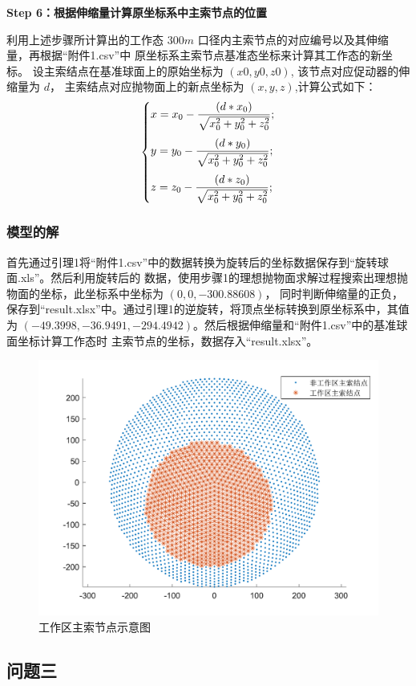 \documentclass[withoutpreface,bwprint]{cumcmthesis} %
\begin{document}
\textbf{Step 6：根据伸缩量计算原坐标系中主索节点的位置}

利用上述步骤所计算出的工作态 $300m$ 口径内主索节点的对应编号以及其伸缩量，再根据“附件1.csv”中
原坐标系主索节点基准态坐标来计算其工作态的新坐标。
设主索结点在基准球面上的原始坐标为 $(x0, y0, z0)$, 该节点对应促动器的伸缩量为 $d$，
主索结点对应抛物面上的新点坐标为 $(x, y,z)$,计算公式如下：
\[
    \begin{dcases}
        \smallskip
        x = x_0 - \frac{(d*x_0)}{\sqrt{x_0^2+y_0^2+z_0^2}}; \\
        \smallskip
        y = y_0 - \frac{(d*y_0)}{\sqrt{x_0^2+y_0^2+z_0^2}}; \\
        z = z_0 - \frac{(d*z_0)}{\sqrt{x_0^2+y_0^2+z_0^2}};
    \end{dcases}
\]
\subsubsection{模型的解}
首先通过引理1将“附件1.csv”中的数据转换为旋转后的坐标数据保存到“旋转球面.xls”。然后利用旋转后的
数据，使用步骤1的理想抛物面求解过程搜索出理想抛物面的坐标，此坐标系中坐标为 $(0,0,-300.88608)$，
同时判断伸缩量的正负，保存到“result.xlsx”中。通过引理1的逆旋转，将顶点坐标转换到原坐标系中，其值
为 $(-49.3998,-36.9491,-294.4942)$。然后根据伸缩量和“附件1.csv”中的基准球面坐标计算工作态时
主索节点的坐标，数据存入“result.xlsx”。
\begin{figure}[!h]
    \centering
    \includegraphics[scale=0.8]{A2.pdf}
    \caption{工作区主索节点示意图}
\end{figure}
\subsection{问题三}
\end{document}
